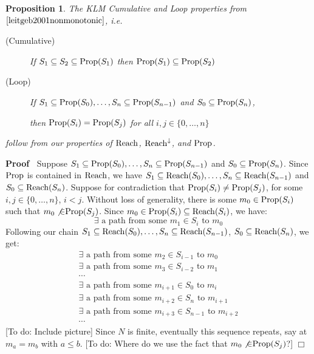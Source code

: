 \documentclass{article}
\newcommand{\tmop}[1]{\ensuremath{\operatorname{#1}}}
\newcommand{\todo}[1]{{\color{red!75!black}[To do: #1]}}
\newenvironment{proof}{\noindent\textbf{Proof\ }}{\hspace*{\fill}$\Box$\medskip}
\newtheorem{proposition}{Proposition}
\newcommand{\Reach}{\textsf{\tmop{Reach}}}
\newcommand{\Reachedby}{\textsf{\tmop{Reach}}^{\downarrow}}
\newcommand{\Prop}{\textsf{\tmop{Prop}}}
\begin{document}
\begin{proposition}
  The KLM Cumulative and Loop properties from
  $\cite{leitgeb2001nonmonotonic}$, i.e.
  \begin{description}
    \item[(Cumulative)] If $S_1 \subseteq S_2 \subseteq \Prop (S_1)$ then
    $\Prop (S_1) \subseteq \Prop (S_2)$
    
    \item[(Loop)] If $S_1 \subseteq \Prop (S_0), \ldots, S_n \subseteq \Prop
    (S_{n - 1})$ and $S_0 \subseteq \Prop (S_n)$,
    
    then $\Prop (S_i) = \Prop (S_j)$ for all $i, j \in \{ 0, \ldots, n \}$
  \end{description}
  follow from our properties of $\Reach$, $\Reachedby$, and $\Prop$.
\end{proposition}

\begin{proof}
  Suppose $S_1 \subseteq \Prop (S_0), \ldots, S_n \subseteq \Prop (S_{n - 1})$
  and $S_0 \subseteq \Prop (S_n)$. Since $\Prop$ is contained in $\Reach$, we
  have $S_1 \subseteq \Reach (S_0), \ldots, S_n \subseteq \Reach (S_{n - 1})$
  and $S_0 \subseteq \Reach (S_n)$. Suppose for contradiction that $\Prop
  (S_i) \neq \Prop (S_j)$, for some $i, j \in \{ 0, \ldots, n \}$, $i < j$.
  Without loss of generality, there is some $m_0 \in \Prop (S_i)$ such that
  $m_0 \not{\in} \Prop (S_j)$. Since $m_0 \in \Prop (S_i) \subseteq \Reach
  (S_i)$, we have:
  \[ \exists \text{ a path from some } m_1 \in S_i \text{ to } m_0 \]
  Following our chain $S_1 \subseteq \Reach (S_0), \ldots, S_n \subseteq
  \Reach (S_{n - 1})$, $S_0 \subseteq \Reach (S_n)$, we get:
  \[ \begin{array}{c}
       \exists \text{ a path from some } m_2 \in S_{i - 1} \text{ to } m_0\\
       \exists \text{ a path from some } m_3 \in S_{i - 2} \text{ to } m_1\\
       \cdots\\
       \exists \text{ a path from some } m_{i + 1} \in S_0 \text{ to } m_i\\
       \exists \text{ a path from some } m_{i + 2} \in S_n \text{ to } m_{i +
       1}\\
       \exists \text{ a path from some } m_{i + 3} \in S_{n - 1} \text{ to }
       m_{i + 2}\\
       \cdots
     \end{array} \]
  {\todo{Include picture}} Since $N$ is finite, eventually this sequence
  repeats, say at $m_a = m_b$ with $a \leqslant b$. {\todo{Where do we use the
  fact that $m_0 \not{\in} \Prop (S_j)$?}}
\end{proof}
\end{document}
